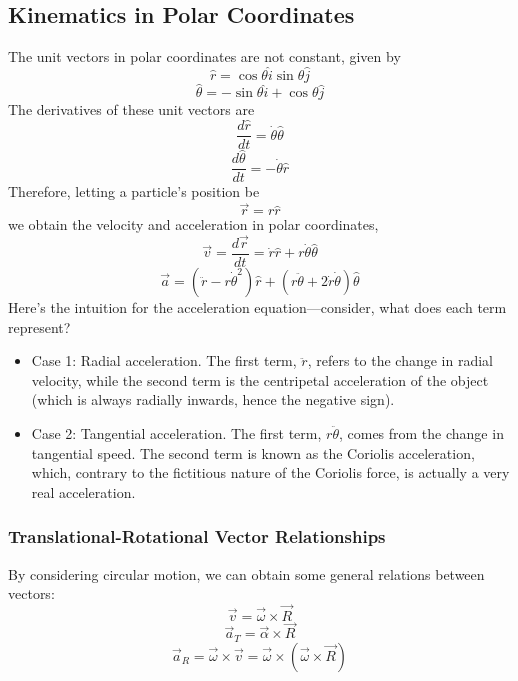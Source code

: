 \documentclass[../PhysicsFormulae.tex]{subfiles}
\begin{document}
\subsection{Kinematics in Polar Coordinates}
The unit vectors in polar coordinates are not constant, given by 
\[ \hat{r} = \cos{\theta} \hat{i} \sin{\theta} \hat{j} \]
\[ \hat{\theta} = -\sin{\theta} \hat{i} + \cos{\theta} \hat{j} \]
The derivatives of these unit vectors are 
\[ \frac{d\hat{r}}{dt} = \dot{\theta} \hat{\theta} \]
\[ \frac{d\hat{ \theta} }{dt} = -\dot{\theta} \hat{r} \]
Therefore, letting a particle's position be 
\[ \vec{r} = r \hat{r} \]
we obtain the velocity and acceleration in polar coordinates, 
\[ \vec{v} = \frac{d\vec{r}}{dt} = \dot{r} \hat{r} + r \dot{\theta} \hat{\theta} \]
\[ \vec{a} = (\ddot{r} - r\dot{\theta}^2) \hat{r} + (r\ddot{\theta} + 2\dot{r}\dot{\theta} ) \hat{\theta} \]
Here's the intuition for the acceleration equation---consider, what does each term represent?
\begin{itemize}
	\itemsep0em
	\item Case 1: Radial acceleration. The first term, $\ddot{r}$, refers to the change in radial velocity, while the second term is the centripetal acceleration of the object (which is always radially inwards, hence the negative sign). 
	\item Case 2: Tangential acceleration. The first term, $r \ddot{\theta}$, comes from the change in tangential speed. The second term is known as the Coriolis acceleration, which, contrary to the fictitious nature of the Coriolis force, is actually a very real acceleration. 
\end{itemize}

\subsubsection{Translational-Rotational Vector Relationships}
By considering circular motion, we can obtain some general relations between vectors:
\[ \vec{v} = \vec{\omega} \times \vec{R} \]
\[ \vec{a}_T = \vec{\alpha} \times \vec{R} \]
\[ \vec{a}_R = \vec{\omega} \times \vec{v} = \vec{\omega} \times (\vec{\omega} \times \vec{R} ) \]
\end{document}
